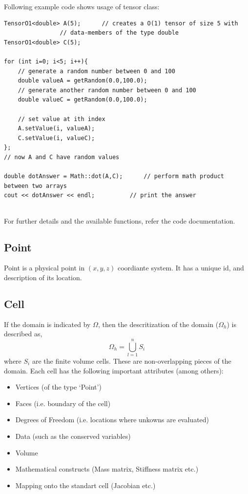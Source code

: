 Following example code shows usage of tensor class:
\begin{verbatim}
TensorO1<double> A(5);		// creates a O(1) tensor of size 5 with 
				// data-members of the type double
TensorO1<double> C(5);

for (int i=0; i<5; i++){
	// generate a random number between 0 and 100
	double valueA = getRandom(0.0,100.0);	
	// generate another random number between 0 and 100
	double valueC = getRandom(0.0,100.0);	

	// set value at ith index
	A.setValue(i, valueA);			
	C.setValue(i, valueC);
};
// now A and C have random values 

double dotAnswer = Math::dot(A,C);		// perform math product between two arrays
cout << dotAnswer << endl;			// print the answer


\end{verbatim}

For further details and the available functions, refer the code documentation.

\subsection{Point}
Point is a physical point in $(x,y,z)$ coordiante system. It has a unique id, and description of its location. 

\subsection{Cell}
If the domain is indicated by $\Omega$, then the descritization of the domain ($\Omega_h$) is described as,
\begin{equation}
	\Omega_h = \bigcup\limits_{l = 1}^ n S_i
\end{equation}
where $S_i$ are the finite volume cells. These are non-overlapping pieces of the domain. 
Each cell has the following important attributes (among others):
\begin{itemize}
	\item Vertices (of the type `Point')
	\item Faces (i.e. boundary of the cell)
	\item Degrees of Freedom (i.e. locations where unkowns are evaluated)
	\item Data (such as the conserved variables)
	\item Volume 
	\item Mathematical constructs (Mass matrix, Stiffness matrix etc.)
	\item Mapping onto the standart cell (Jacobian etc.)
\end{itemize}

